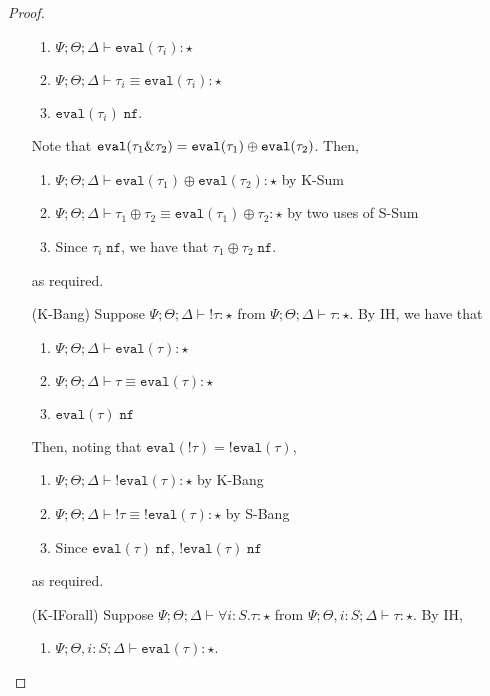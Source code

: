 \begin{proof}
\begin{enumerate}
\begin{enumerate}[1.]
    \item $\Psi ; \Theta ; \Delta \vdash \texttt{eval}(\tau_i) : \star$
    \item $\Psi ; \Theta ; \Delta \vdash \tau_i \equiv \texttt{eval}(\tau_i) : \star$
    \item $\texttt{eval}(\tau_i) \; \texttt{nf}$.
  \end{enumerate}
  Note that $\texttt{eval}(\tau_1 \& \tau_2) = \texttt{eval}(\tau_1) \oplus \texttt{eval}(\tau_2)$. Then,
  \begin{enumerate}[1.]
    \item ${\Psi ; \Theta ; \Delta \vdash \texttt{eval}(\tau_1) \oplus \texttt{eval}(\tau_2) : \star}$ by K-Sum
    \item $\Psi ; \Theta ; \Delta \vdash \tau_1 \oplus \tau_2 \equiv \texttt{eval}(\tau_1) \oplus \tau_2 : \star$ by two uses of S-Sum
    \item Since $\tau_i \; \texttt{nf}$, we have that $\tau_1 \oplus \tau_2 \; \texttt{nf}$.
  \end{enumerate}
  as required.
  \item[(K-Bang)] Suppose ${\Psi ; \Theta ; \Delta \vdash !\tau : \star}$ from ${\Psi ; \Theta ; \Delta \vdash \tau : \star}$.
  By IH, we have that
  \begin{enumerate}[1.]
   \item ${\Psi ; \Theta ; \Delta \vdash \texttt{eval}(\tau) : \star}$
   \item ${\Psi ; \Theta ; \Delta \vdash \tau \equiv \texttt{eval}(\tau) : \star}$
   \item $\texttt{eval}(\tau) \; \texttt{nf}$
  \end{enumerate}
  Then, noting that $\texttt{eval}(!\tau) = !\texttt{eval}(\tau)$,
  \begin{enumerate}[1.]
   \item ${\Psi ; \Theta ; \Delta \vdash !\texttt{eval}(\tau) : \star}$ by K-Bang
   \item ${\Psi ; \Theta ; \Delta \vdash !\tau \equiv !\texttt{eval}(\tau) : \star}$ by S-Bang
   \item Since $\texttt{eval}(\tau) \; \texttt{nf}$, $!\texttt{eval}(\tau) \; \texttt{nf}$
  \end{enumerate}
  as required.
  \item[(K-IForall)] Suppose ${\Psi ; \Theta ; \Delta \vdash \forall i : S. \tau : \star}$ from ${\Psi ; \Theta, i : S ; \Delta \vdash \tau : \star}$.
  By IH,
  \begin{enumerate}[1.]
   \item ${\Psi ; \Theta, i : S ; \Delta \vdash \texttt{eval}(\tau) : \star}$.

\end{enumerate}
\end{enumerate}
\end{proof}
